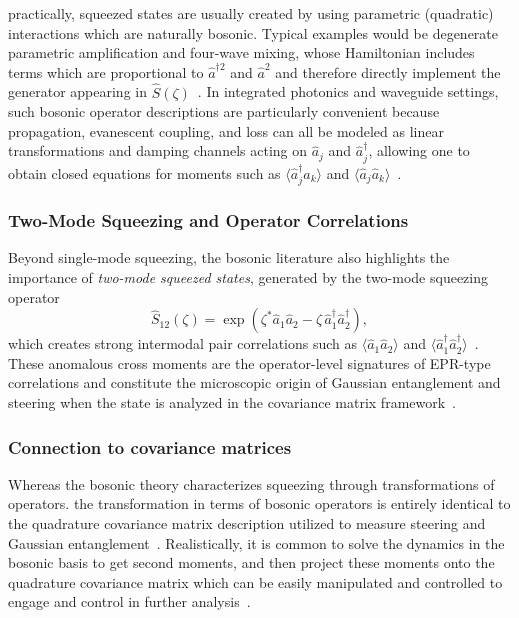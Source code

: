 practically, squeezed states are usually created by using parametric (quadratic) interactions which are naturally bosonic. Typical examples would be degenerate parametric amplification and four-wave mixing, whose Hamiltonian includes terms which are proportional to $\hat a^{\dagger 2}$ and $\hat a^2$ and
therefore directly implement the generator appearing in $\hat S(\zeta)$~\cite{Walls1983}.
In integrated photonics and waveguide settings, such bosonic operator descriptions are
particularly convenient because propagation, evanescent coupling, and loss can all be modeled
as linear transformations and damping channels acting on $\hat a_j$ and $\hat a_j^\dagger$,
allowing one to obtain closed equations for moments such as
$\langle \hat a_j^\dagger \hat a_k\rangle$ and $\langle \hat a_j \hat a_k\rangle$~\cite{Weedbrook2012}.

\subsubsection{Two-Mode Squeezing and Operator Correlations}
Beyond single-mode squeezing, the bosonic literature also highlights the importance of
\emph{two-mode squeezed states}, generated by the two-mode squeezing operator
\begin{equation}
	\hat S_{12}(\zeta)=\exp\!\left(\zeta^* \hat a_1 \hat a_2-\zeta\,\hat a_1^\dagger \hat a_2^\dagger\right),
\end{equation}
which creates strong intermodal pair correlations such as $\langle \hat a_1 \hat a_2\rangle$
and $\langle \hat a_1^\dagger \hat a_2^\dagger\rangle$~\cite{Weedbrook2012,AdessoRagyLee2014}.
These anomalous cross moments are the operator-level signatures of EPR-type correlations and
constitute the microscopic origin of Gaussian entanglement and steering when the state is
analyzed in the covariance matrix framework~\cite{AdessoRagyLee2014}.

\subsubsection{Connection to covariance matrices}
Whereas the bosonic theory characterizes squeezing through transformations of operators.
the transformation in terms of bosonic operators is entirely identical to the quadrature covariance matrix description utilized to measure steering and Gaussian entanglement~\cite{Weedbrook2012,AdessoRagyLee2014}.
Realistically, it is common to solve the dynamics in the bosonic basis to get second moments,
and then project these moments onto the quadrature covariance matrix which can be easily manipulated and controlled to engage and control in further analysis~\cite{Weedbrook2012}.




